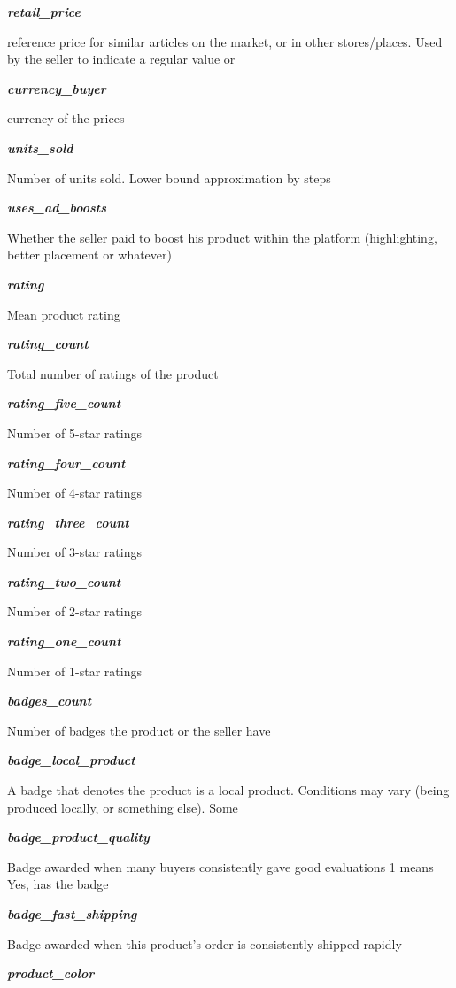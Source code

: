 \documentclass[
]{article}
\begin{document}
\textbf{\emph{retail\_price}}

reference price for similar articles on the market, or in other
stores/places. Used by the seller to indicate a regular value or

\textbf{\emph{currency\_buyer}}

currency of the prices

\textbf{\emph{units\_sold}}

Number of units sold. Lower bound approximation by steps

\textbf{\emph{uses\_ad\_boosts}}

Whether the seller paid to boost his product within the platform
(highlighting, better placement or whatever)

\textbf{\emph{rating}}

Mean product rating

\textbf{\emph{rating\_count}}

Total number of ratings of the product

\textbf{\emph{rating\_five\_count}}

Number of 5-star ratings

\textbf{\emph{rating\_four\_count}}

Number of 4-star ratings

\textbf{\emph{rating\_three\_count}}

Number of 3-star ratings

\textbf{\emph{rating\_two\_count}}

Number of 2-star ratings

\textbf{\emph{rating\_one\_count}}

Number of 1-star ratings

\textbf{\emph{badges\_count}}

Number of badges the product or the seller have

\textbf{\emph{badge\_local\_product}}

A badge that denotes the product is a local product. Conditions may vary
(being produced locally, or something else). Some

\textbf{\emph{badge\_product\_quality}}

Badge awarded when many buyers consistently gave good evaluations 1
means Yes, has the badge

\textbf{\emph{badge\_fast\_shipping}}

Badge awarded when this product's order is consistently shipped rapidly

\textbf{\emph{product\_color}}
\end{document}
